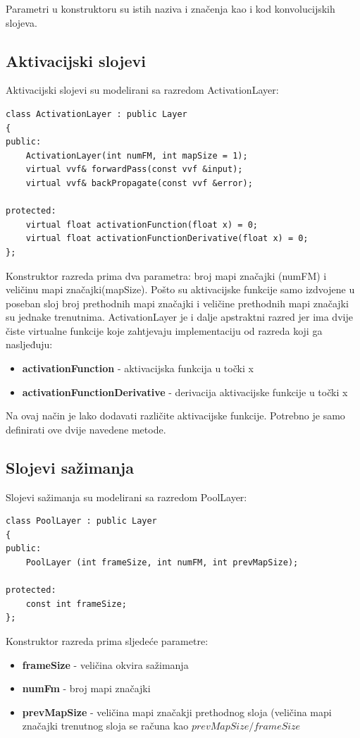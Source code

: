 \documentclass[times, utf8, zavrsni]{fer}
\begin{document}
Parametri u konstruktoru su istih naziva i značenja kao i kod konvolucijskih slojeva.

\subsection{Aktivacijski slojevi}
Aktivacijski slojevi su modelirani sa razredom ActivationLayer:
\begin{lstlisting}[caption=Razred ActivationLayer,
  label=ActivationLayer]
class ActivationLayer : public Layer
{
public:
    ActivationLayer(int numFM, int mapSize = 1);
    virtual vvf& forwardPass(const vvf &input);
    virtual vvf& backPropagate(const vvf &error);

protected:
    virtual float activationFunction(float x) = 0;
    virtual float activationFunctionDerivative(float x) = 0;
};
\end{lstlisting}

Konstruktor razreda prima dva parametra: broj mapi značajki (numFM) i veličinu mapi značajki(mapSize). Pošto su aktivacijske funkcije samo izdvojene u poseban sloj broj prethodnih mapi značajki i veličine prethodnih mapi značajki su jednake trenutnima. ActivationLayer je i dalje apstraktni razred jer ima dvije čiste virtualne funkcije koje zahtjevaju implementaciju od razreda koji ga nasljeđuju:
\begin{itemize}
\item \textbf{activationFunction} - aktivacijska funkcija u točki x
\item \textbf{activationFunctionDerivative} - derivacija aktivacijske funkcije u točki x
\end{itemize}
Na ovaj način je lako dodavati različite aktivacijske funkcije. Potrebno je samo definirati ove dvije navedene metode.


\subsection{Slojevi sažimanja}
Slojevi sažimanja su modelirani sa razredom PoolLayer:
\begin{lstlisting}[caption=Razred PoolLayer,
  label=PoolLayer]
class PoolLayer : public Layer
{
public:
    PoolLayer (int frameSize, int numFM, int prevMapSize); 

protected:
    const int frameSize;
};
\end{lstlisting}

Konstruktor razreda prima sljedeće parametre:
\begin{itemize}
\item \textbf{frameSize} - veličina okvira sažimanja
\item \textbf{numFm} - broj mapi značajki
\item \textbf{prevMapSize} - veličina mapi značakji prethodnog sloja (veličina mapi značajki trenutnog sloja se računa kao $prevMapSize/frameSize$
\end{itemize}
\end{document}
